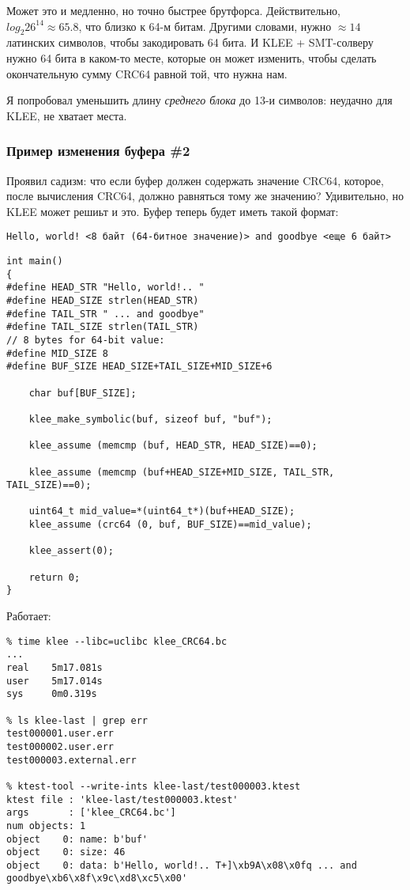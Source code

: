 Может это и медленно, но точно быстрее брутфорса.
Действительно, $log_2{26^{14}} \approx 65.8$, что близко к 64-м битам.
Другими словами, нужно $\approx 14$ латинских символов, чтобы закодировать 64 бита.
И KLEE + \ac{SMT}-солверу нужно 64 бита в каком-то месте, которые он может изменить, чтобы сделать окончательную сумму
CRC64 равной той, что нужна нам.

Я попробовал уменьшить длину \textit{среднего блока} до 13-и символов: неудачно для KLEE, не хватает места.

\subsubsection{Пример изменения буфера \#2}

Проявил садизм: что если буфер должен содержать значение CRC64, которое, после вычисления CRC64, должно равняться тому же значению?
Удивительно, но KLEE может решиьт и это.
Буфер теперь будет иметь такой формат:

\begin{lstlisting}
Hello, world! <8 байт (64-битное значение)> and goodbye <еще 6 байт>
\end{lstlisting}

\begin{lstlisting}
int main()
{
#define HEAD_STR "Hello, world!.. "
#define HEAD_SIZE strlen(HEAD_STR)
#define TAIL_STR " ... and goodbye"
#define TAIL_SIZE strlen(TAIL_STR)
// 8 bytes for 64-bit value:
#define MID_SIZE 8
#define BUF_SIZE HEAD_SIZE+TAIL_SIZE+MID_SIZE+6

	char buf[BUF_SIZE];
  
	klee_make_symbolic(buf, sizeof buf, "buf");

	klee_assume (memcmp (buf, HEAD_STR, HEAD_SIZE)==0);

	klee_assume (memcmp (buf+HEAD_SIZE+MID_SIZE, TAIL_STR, TAIL_SIZE)==0);
	
	uint64_t mid_value=*(uint64_t*)(buf+HEAD_SIZE);
	klee_assume (crc64 (0, buf, BUF_SIZE)==mid_value);

	klee_assert(0);

	return 0;
}
\end{lstlisting}

Работает:

\begin{lstlisting}
% time klee --libc=uclibc klee_CRC64.bc
...
real    5m17.081s
user    5m17.014s
sys     0m0.319s

% ls klee-last | grep err
test000001.user.err
test000002.user.err
test000003.external.err

% ktest-tool --write-ints klee-last/test000003.ktest
ktest file : 'klee-last/test000003.ktest'
args       : ['klee_CRC64.bc']
num objects: 1
object    0: name: b'buf'
object    0: size: 46
object    0: data: b'Hello, world!.. T+]\xb9A\x08\x0fq ... and goodbye\xb6\x8f\x9c\xd8\xc5\x00'
\end{lstlisting}

